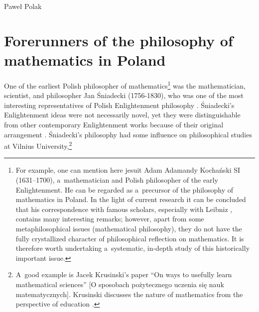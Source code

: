 \begin{artengenv}{Paweł Polak}
\section*{Forerunners of the philosophy of mathematics in Poland}

One of the earliest Polish philosopher of mathematics\footnote{For example, one can mention here jesuit Adam Adamandy Kochański SI (1631--1700), a~mathematician and Polish philosopher of the early Enlightenment. He can be regarded as a~precursor of the philosophy of mathematics in Poland. In the light of current research it can be concluded that his correspondence with famous scholars, especially with Leibniz
\parencites[see][]{kochanski_korespondencja_2005}[][]{kochanski_korespondencja_2019}[][]{polak_nauka_2019}, %
 contains many interesting remarks; however, apart from some metaphilosophical issues (mathematical philosophy), they do not have the fully crystallized character of philosophical reflection on mathematics. It is therefore worth undertaking a~systematic, in-depth study of this historically important issue.} was the mathematician, scientist, and philosopher Jan Śniadecki (1756-1830), who was one of the most interesting representatives of Polish Enlightenment philosophy 
\parencites[e.g.][pp.1–5]{murawski_philosophy_2014}[][]{straszewski_jan_1875}. %
 Śniadecki's Enlightenment ideas were not necessarily novel, yet they were distinguishable from other contemporary Enlightenment works because of their original arrangement 
\parencite[][]{roskal_jana_1994}. %
 Śniadecki's philosophy had some influence on philosophical studies at Vilnius University,\footnote{A~good example is Jacek Krusinski's paper ``On ways to usefully learn mathematical sciences'' [O sposobach pożytecznego uczenia się nauk matematycznych]. Krusinski discusses the nature of mathematics from the perspective of education 
\parencite[][]{krusinski_o_1806}. %
}
\end{artengenv}
